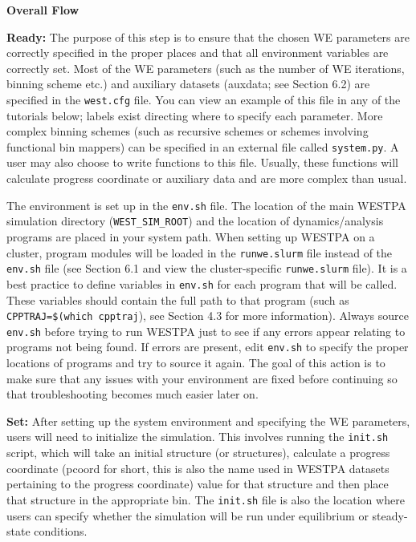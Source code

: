 \documentclass[9pt,tutorial,pubversion]{livecoms}
\begin{document}
\textbf{Overall Flow}

\textbf{Ready:} The purpose of this step is to ensure that the chosen WE parameters are correctly specified in the proper places and that all environment variables are correctly set. 
Most of the WE parameters (such as the number of WE iterations, binning scheme etc.) and auxiliary datasets (auxdata; see Section 6.2) are specified in the \verb|west.cfg| file. 
You can view an example of this file in any of the tutorials below; labels exist directing where to specify each parameter. 
More complex binning schemes (such as recursive schemes or schemes involving functional bin mappers) can be specified in an external file called \verb|system.py|. 
A user may also choose to write functions to this file. 
Usually, these functions will calculate progress coordinate or auxiliary data and are more complex than usual.

The environment is set up in the \verb|env.sh| file. 
The location of the main WESTPA simulation directory (\verb|WEST_SIM_ROOT|) and the location of dynamics/analysis programs are placed in your system path. 
When setting up WESTPA on a cluster, program modules will be loaded in the \verb|runwe.slurm| file instead of the \verb|env.sh| file (see Section 6.1 and view the cluster-specific \verb|runwe.slurm| file). 
It is a best practice to define variables in \verb|env.sh| for each program that will be called. 
These variables should contain the full path to that program (such as \verb|CPPTRAJ=$(which cpptraj|), see Section 4.3 for more information). 
Always source \verb|env.sh| before trying to run WESTPA just to see if any errors appear relating to programs not being found. 
If errors are present, edit \verb|env.sh| to specify the proper locations of programs and try to source it again. 
The goal of this action is to make sure that any issues with your environment are fixed before continuing so that troubleshooting becomes much easier later on. 

\textbf{Set:} After setting up the system environment and specifying the WE parameters, users will need to initialize the simulation. 
This involves running the \verb|init.sh| script, which will take an initial structure (or structures), calculate a progress coordinate (pcoord for short, this is also the name used in WESTPA datasets pertaining to the progress coordinate) value for that structure and then place that structure in the appropriate bin. 
The \verb|init.sh| file is also the location where users can specify whether the simulation will be run under equilibrium or steady-state conditions. 
\end{document}
